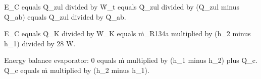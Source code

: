 E_C equals Q̇_zul divided by Ẇ_t equals Q̇_zul divided by (Q̇_zul minus Q̇_ab) equals Q̇_zul divided by Q̇_ab.  

E_C equals Q̇_K divided by Ẇ_K equals ṁ_R134a multiplied by (h_2 minus h_1) divided by 28 W.  

Energy balance evaporator:  
0 equals ṁ multiplied by (h_1 minus h_2) plus Q̇_c.  
Q̇_c equals ṁ multiplied by (h_2 minus h_1).